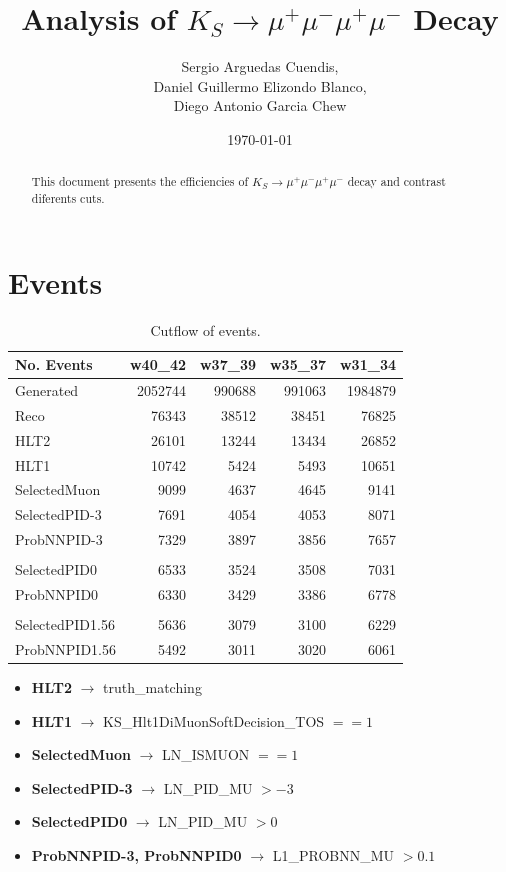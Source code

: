 \documentclass[12pt,a4paper]{article}
\title{Analysis of $K_S \rightarrow \mu^+\mu^-\mu^+\mu^-$ Decay}
\author{Sergio Arguedas Cuendis,\\ Daniel Guillermo Elizondo Blanco, \\Diego Antonio Garcia Chew}
\date{\today}
\begin{document}
% 
\maketitle

\begin{abstract}
This document presents the efficiencies of $K_S \rightarrow \mu^+\mu^-\mu^+\mu^-$ decay 
and contrast diferents cuts.
\end{abstract}


\newpage
\section{Events}
\begin{table}[h]
\centering
\begin{tabular}{lrrrr}
\hline
 No. Events    &   w40\_42 &   w37\_39 &   w35\_37 &   w31\_34 \\
\hline
 Generated     &   2052744 &    990688 &    991063 &   1984879 \\
 Reco          &     76343 &     38512 &     38451 &     76825 \\
 HLT2          &     26101 &     13244 &     13434 &     26852 \\
 HLT1          &     10742 &      5424 &      5493 &     10651 \\
 SelectedMuon  &      9099 &      4637 &      4645 &      9141 \\
 SelectedPID-3 &      7691 &      4054 &      4053 &      8071 \\
 ProbNNPID-3   &      7329 &      3897 &      3856 &      7657 \\
 \hline        &           &           &           &           \\
 SelectedPID0  &      6533 &      3524 &      3508 &      7031 \\
 ProbNNPID0    &      6330 &      3429 &      3386 &      6778 \\
\hline         &            &         &          &     \\
 SelectedPID1.56  &      5636 &      3079 &      3100 &      6229 \\
 ProbNNPID1.56    &      5492 &      3011 &      3020 &      6061 \\
\hline
\end{tabular}
\caption{Cutflow of events.}
\end{table}
\begin{itemize}
    \item \textbf{HLT2} $\to$ truth\_matching
    \item \textbf{HLT1} $\to$ KS\_Hlt1DiMuonSoftDecision\_TOS $== 1$
    \item \textbf{SelectedMuon} $\to$ LN\_ISMUON $== 1$
    \item \textbf{SelectedPID-3} $\to$ LN\_PID\_MU $> -3$
    \item \textbf{SelectedPID0} $\to$ LN\_PID\_MU $> 0$
    \item \textbf{ProbNNPID-3, ProbNNPID0} $\to$ L1\_PROBNN\_MU $> 0.1$
\end{itemize}
\newpage
\end{document}
